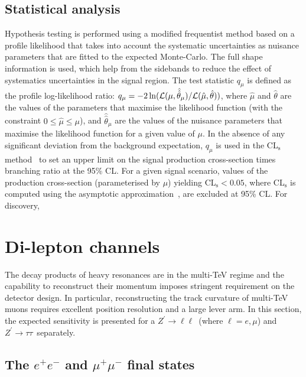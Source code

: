 \documentclass[a4paper,11pt]{article}
\newcommand*{\Zptata}{\ensuremath{Z^{\prime}\rightarrow \tau\tau}}
\newcommand*{\Zpll}{\ensuremath{Z^{\prime}\rightarrow \ell\ell}}
\newcommand*{\ee}{\ensuremath{e^{+}e^{-}}}
\newcommand*{\mumu}{\ensuremath{\mu^{+}\mu^{-}}}
\begin{document}
\subsection{Statistical analysis}
Hypothesis testing is performed using a modified frequentist method based on a profile likelihood that takes into account the systematic uncertainties as nuisance parameters that are fitted to the expected Monte-Carlo. The full shape information is used, which help from the sidebands to reduce the effect of systematics uncertainties in the signal region. The test statistic $q_\mu$ is defined as the profile log-likelihood ratio:
$q_\mu = -2\ln({\cal L}(\mu,\hat{\hat{\theta}}_\mu)/{\cal L}(\hat{\mu},\hat{\theta}))$,
where $\hat{\mu}$ and $\hat{\theta}$ are the values of the parameters that
maximise the likelihood function (with the constraint $0\leq \hat{\mu} \leq \mu$),
and $\hat{\hat{\theta}}_\mu$ are the values of the nuisance parameters that maximise
the likelihood function for a given value of $\mu$.
In the absence of any significant deviation from the background expectation,
$q_\mu$ is used in the CL$_\text{s}$ method~\cite{Junk:1999kv,Read:2002hq} to set an upper limit
on the signal production cross-section times branching ratio at the 95\% CL. For a given signal scenario,
values of the production cross-section (parameterised by $\mu$) yielding CL$_\text{s} < 0.05$,
where CL$_\text{s}$ is computed using the asymptotic approximation~\cite{Cowan:2010js},
are excluded at 95\% CL. For discovery, 



\section{Di-lepton channels}
\label{sec:lep}

The decay products of heavy resonances are in the multi-TeV regime and the capability to reconstruct their momentum imposes stringent requirement on the detector design. In particular, reconstructing the track curvature of multi-TeV muons requires excellent position resolution and a large lever arm. In this section, the expected sensitivity is presented for a \Zpll\ (where $\ell=e,\mu$) and \Zptata\ separately.

\subsection{The \texorpdfstring{\ee}{ee} and \texorpdfstring{\mumu}{mumu} final states}
\label{sec:lepee}
\end{document}
